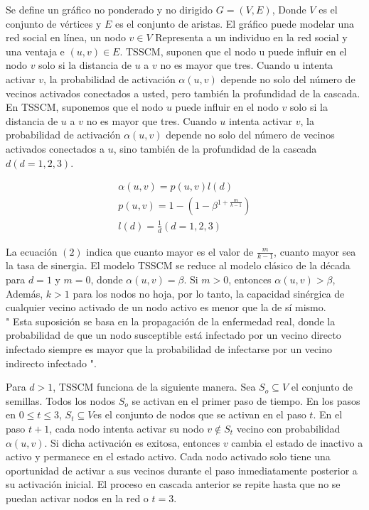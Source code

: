 \documentclass{article}
\begin{document}
Se define un gráfico no ponderado y no dirigido $G = (V,E)$, Donde $V$ es el conjunto de vértices y $E$ es el conjunto de aristas. El gráfico puede modelar una red social en línea, un nodo $v \in V$ Representa a un individuo en la red social y una ventaja e $(u, v) \in E$. TSSCM, suponen que el nodo u puede influir en el nodo $v$ solo si la distancia de $u$ a $v$ no es mayor que tres. Cuando u intenta activar $v$, la probabilidad de activación $\alpha(u, v)$ depende no solo del número de vecinos activados conectados a usted, pero también la profundidad de la cascada.\\

En TSSCM, suponemos que el nodo $u$ puede influir en el nodo $v$ solo si la distancia de $u$ a $v$ no es mayor que tres. Cuando $u$ intenta activar $v$, la probabilidad de activación $\alpha(u, v)$ depende no solo del número de vecinos activados conectados a $u$, sino también de la profundidad de la cascada $d(d = 1,2,3)$.


\begin{eqnarray}
	\alpha(u,v) = p(u,v)l(d) \\
	p(u,v) = 1 - (1 - \beta^{ 1 + \frac{m}{k-1} })\\
	l(d) = \frac{1}{d}(d = 1,2,3)
\end{eqnarray}


La ecuación $(2)$ indica que cuanto mayor es el valor de $\frac{m}{k - 1}$, cuanto mayor sea la tasa de sinergia. El modelo TSSCM se reduce al modelo clásico de la década para $d = 1$ y $m = 0$, donde $\alpha(u, v) = \beta$. Si $m > 0$, entonces $\alpha(u, v) > \beta$, Además, $k > 1$ para los nodos no hoja, por lo tanto, la capacidad sinérgica de cualquier vecino activado de un nodo activo es menor que la de sí mismo.\\

" Esta suposición se basa en la propagación de la enfermedad real, donde la probabilidad de que un nodo susceptible está infectado por un vecino directo infectado siempre es mayor que la probabilidad de infectarse por un vecino indirecto infectado ".\cite{cite:36}

Para $d > 1$, TSSCM funciona de la siguiente manera. Sea $S_o \subseteq V$ el conjunto de semillas. Todos los nodos $S_o$ se activan en el primer paso de tiempo. En los pasos en $0\leq t \leq 3$, $S_t \subseteq V $es el conjunto de nodos que se activan en el paso $t$. En el paso $t + 1$, cada nodo intenta activar su nodo $v\not\in S_t$ vecino con probabilidad $\alpha(u, v)$. Si dicha activación es exitosa, entonces $v$ cambia el estado de inactivo a activo y permanece en el estado activo. Cada nodo activado solo tiene una oportunidad de activar a sus vecinos durante el paso inmediatamente posterior a su activación inicial. El proceso en cascada anterior se repite hasta que no se puedan activar nodos en la red o $t = 3$. 
\end{document}
